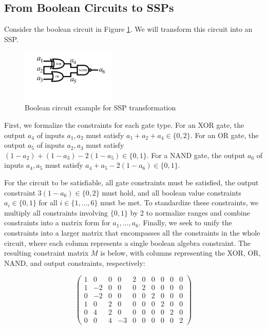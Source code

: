 \subsection{From Boolean Circuits to SSPs}

Consider the boolean circuit in Figure \ref{fig:ssp}. We will transform this circuit into an SSP.

\begin{figure}[h]
  \centering
  \includegraphics[width=0.4\textwidth]{figures/ssp.pdf}
  \caption{Boolean circuit example for SSP transformation \label{fig:ssp}} 
\end{figure}

First, we formalize the constraints for each gate type. For an XOR gate, the output $a_4$ of inputs $a_1, a_2$ must satisfy $a_1 + a_2 + a_4 \in \{0, 2\}$. For an OR gate, the output $a_5$ of inputs $a_2, a_3$ must satisfy $(1-a_2) + (1-a_3) - 2(1-a_5) \in \{0, 1\}$. For a NAND gate, the output $a_6$ of inputs $a_4, a_5$ must satisfy $a_4 + a_5 - 2(1-a_6) \in \{0, 1\}$.

For the circuit to be satisfiable, all gate constraints must be satisfied, the output constraint $3(1 - a_6) \in \{0, 2\}$ must hold, and all boolean value constraints $a_i \in \{0, 1\}$ for all $i \in \{1,\ldots,6\}$ must be met. To standardize these constraints, we multiply all constraints involving $\{0, 1\}$ by 2 to normalize ranges and combine constraints into a matrix form for $a_1,\ldots,a_6$. Finally, we seek to unify the constraints into a larger matrix that encompasses all the constraints in the whole circuit, where each column represents a single boolean algebra constraint. The resulting constraint matrix $M$ is below, with columns representing the XOR, OR, NAND, and output constraints, respectively:

\[ \begin{pmatrix}
1 & 0 & 0 & 0 & 2 & 0 & 0 & 0 & 0 & 0 \\
1 & -2 & 0 & 0 & 0 & 2 & 0 & 0 & 0 & 0 \\
0 & -2 & 0 & 0 & 0 & 0 & 2 & 0 & 0 & 0 \\
1 & 0 & 2 & 0 & 0 & 0 & 0 & 2 & 0 & 0 \\
0 & 4 & 2 & 0 & 0 & 0 & 0 & 0 & 2 & 0 \\
0 & 0 & 4 & -3 & 0 & 0 & 0 & 0 & 0 & 2
\end{pmatrix} \]

